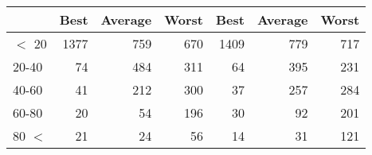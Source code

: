 
\begin{tabular}[t]{lrrrrrr}
\toprule
 & Best & Average & Worst & Best & Average & Worst\\
\midrule
$<$ 20 & 1377 & 759 & 670 & 1409 & 779 & 717\\
20-40 & 74 & 484 & 311 & 64 & 395 & 231\\
40-60 & 41 & 212 & 300 & 37 & 257 & 284\\
60-80 & 20 & 54 & 196 & 30 & 92 & 201\\
80 $<$ & 21 & 24 & 56 & 14 & 31 & 121\\
\bottomrule
\end{tabular}
